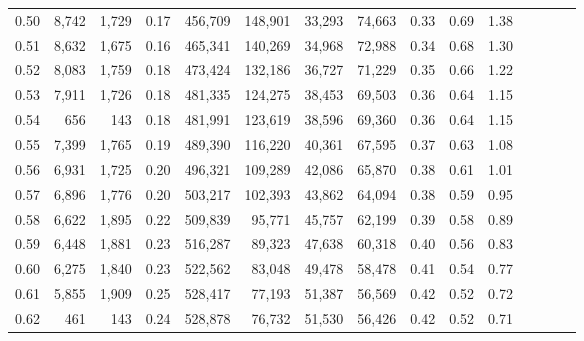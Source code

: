 \begin{tabular}{rrrcrrrrrrrrrrr}
0.50 &   8,742 &  1,729 &                                       0.17 &  456,709 &  148,901 &   33,293 &   74,663 &  0.33 &  0.69 &                         1.38 \\
0.51 &   8,632 &  1,675 &                                       0.16 &  465,341 &  140,269 &   34,968 &   72,988 &  0.34 &  0.68 &                         1.30 \\
0.52 &   8,083 &  1,759 &                                       0.18 &  473,424 &  132,186 &   36,727 &   71,229 &  0.35 &  0.66 &                         1.22 \\
0.53 &   7,911 &  1,726 &                                       0.18 &  481,335 &  124,275 &   38,453 &   69,503 &  0.36 &  0.64 &                         1.15 \\
0.54 &     656 &    143 &                                       0.18 &  481,991 &  123,619 &   38,596 &   69,360 &  0.36 &  0.64 &                         1.15 \\
0.55 &   7,399 &  1,765 &                                       0.19 &  489,390 &  116,220 &   40,361 &   67,595 &  0.37 &  0.63 &                         1.08 \\
0.56 &   6,931 &  1,725 &                                       0.20 &  496,321 &  109,289 &   42,086 &   65,870 &  0.38 &  0.61 &                         1.01 \\
0.57 &   6,896 &  1,776 &                                       0.20 &  503,217 &  102,393 &   43,862 &   64,094 &  0.38 &  0.59 &                         0.95 \\
0.58 &   6,622 &  1,895 &                                       0.22 &  509,839 &   95,771 &   45,757 &   62,199 &  0.39 &  0.58 &                         0.89 \\
0.59 &   6,448 &  1,881 &                                       0.23 &  516,287 &   89,323 &   47,638 &   60,318 &  0.40 &  0.56 &                         0.83 \\
0.60 &   6,275 &  1,840 &                                       0.23 &  522,562 &   83,048 &   49,478 &   58,478 &  0.41 &  0.54 &                         0.77 \\
0.61 &   5,855 &  1,909 &                                       0.25 &  528,417 &   77,193 &   51,387 &   56,569 &  0.42 &  0.52 &                         0.72 \\
0.62 &     461 &    143 &                                       0.24 &  528,878 &   76,732 &   51,530 &   56,426 &  0.42 &  0.52 &                         0.71 \\

\end{tabular}
